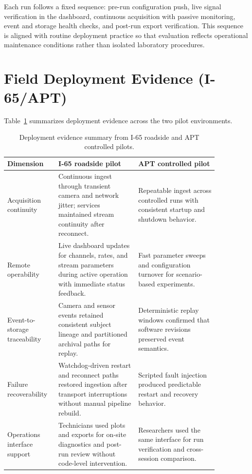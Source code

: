 \documentclass[conference]{IEEEtran}
\begin{document}
Each run follows a fixed sequence: pre-run configuration push, live signal verification in the dashboard, continuous acquisition with passive monitoring, event and storage health checks, and post-run export verification. This sequence is aligned with routine deployment practice so that evaluation reflects operational maintenance conditions rather than isolated laboratory procedures.

\section{Field Deployment Evidence (I-65/APT)}
Table~\ref{tab:deployment_evidence} summarizes deployment evidence across the two pilot environments.

\begin{table}[t]
\caption{Deployment evidence summary from I-65 roadside and APT controlled pilots.}
\label{tab:deployment_evidence}
\centering
\footnotesize
\begin{tabular}{@{}p{0.18\linewidth}p{0.34\linewidth}p{0.34\linewidth}@{}}
\toprule
Dimension & I-65 roadside pilot & APT controlled pilot \\
\midrule
Acquisition continuity & Continuous ingest through transient camera and network jitter; services maintained stream continuity after reconnect. & Repeatable ingest across controlled runs with consistent startup and shutdown behavior. \\
Remote operability & Live dashboard updates for channels, rates, and stream parameters during active operation with immediate status feedback. & Fast parameter sweeps and configuration turnover for scenario-based experiments. \\
Event-to-storage traceability & Camera and sensor events retained consistent subject lineage and partitioned archival paths for replay. & Deterministic replay windows confirmed that software revisions preserved event semantics. \\
Failure recoverability & Watchdog-driven restart and reconnect paths restored ingestion after transport interruptions without manual pipeline rebuild. & Scripted fault injection produced predictable restart and recovery behavior. \\
Operations interface support & Technicians used plots and exports for on-site diagnostics and post-run review without code-level intervention. & Researchers used the same interface for run verification and cross-session comparison. \\
\bottomrule
\end{tabular}
\end{table}
\end{document}
